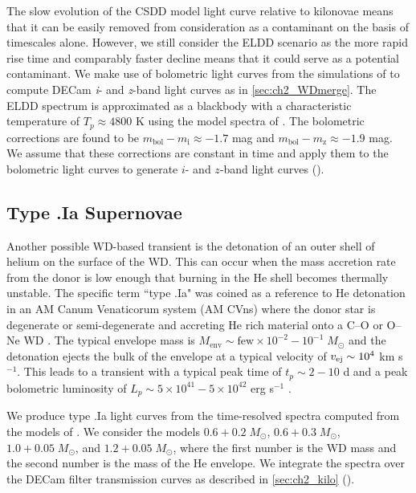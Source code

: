 The slow evolution of the CSDD model light curve relative to kilonovae means that it can be easily removed from consideration as a contaminant on the basis of timescales alone. However, we still consider the ELDD scenario as the more rapid rise time and comparably faster decline means that it could serve as a potential contaminant. We make use of bolometric light curves from the simulations of \citet{Sim+12} to compute DECam {\em i}- and {\em z}-band light curves as in \cref{sec:ch2_WDmerge}. The ELDD spectrum is approximated as a blackbody with a characteristic temperature of $T_p \approx 4800$ K using the model spectra of \citet[see their Figure 7]{Sim+12}. The bolometric corrections are found to be $m_{\text{bol}} - m_{\text{i}} \approx -1.7$  mag and $m_{\text{bol}} - m_{\text{z}} \approx -1.9$ mag. We assume that these corrections are constant in time and apply them to the bolometric light curves to generate $i$- and $z$-band light curves ().

\subsection{Type .Ia Supernovae}
\label{sec:ch2_type.Ia}
Another possible WD-based transient is the detonation of an outer shell of helium on the surface of the WD. This can occur when the mass accretion rate from the donor is low enough that burning in the He shell becomes thermally unstable. The specific term ``type .Ia" was coined as a reference to He detonation in an AM Canum Venaticorum system (AM CVns) where the donor star is degenerate or semi-degenerate and accreting He rich material onto a C--O or O--Ne WD \citet{Bildsten+07,Shen+10}. The typical envelope mass is $M_{\text{env}} \sim \text{few}\times10^{-2}-10^{-1}\;M_{\odot}$ and the detonation ejects the bulk of the envelope at a typical velocity of $v_{\rm ej} \sim 10^4$ km s$^{-1}$. This leads to a transient with a typical peak time of $t_p \sim 2-10$ d and a peak bolometric luminosity of $L_p \sim 5\times10^{41} - 5\times 10^{42}$ erg s$^{-1}$ \citep{Shen+10}.

We produce type .Ia light curves from the time-resolved spectra computed from the models of \citet{Shen+10}. We consider the models $0.6+0.2\;M_{\odot}$, $0.6+0.3\;M_{\odot}$, $1.0+0.05\;M_{\odot}$, and $1.2+0.05\;M_{\odot}$, where the first number is the WD mass and the second number is the mass of the He envelope. We integrate the spectra over the DECam filter transmission curves as described in \cref{sec:ch2_kilo} ().


